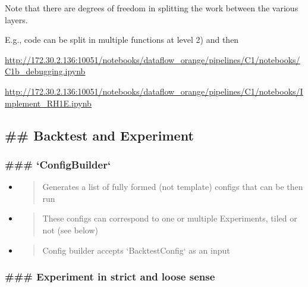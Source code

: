 \documentclass[11pt, reqno]{amsart}
\begin{document}
Note that there are degrees of freedom in splitting the work between the
various layers.

E.g., code can be split in multiple functions at level 2) and then

\href{http://172.30.2.136:10051/notebooks/dataflow_orange/pipelines/C1/notebooks/C1b_debugging.ipynb}{\ul{http://172.30.2.136:10051/notebooks/dataflow\_orange/pipelines/C1/notebooks/C1b\_debugging.ipynb}}

\href{http://172.30.2.136:10051/notebooks/dataflow_orange/pipelines/C1/notebooks/Implement_RH1E.ipynb}{\ul{http://172.30.2.136:10051/notebooks/dataflow\_orange/pipelines/C1/notebooks/Implement\_RH1E.ipynb}}

\hypertarget{backtest-and-experiment}{%
\subsection{\#\# Backtest and
Experiment}\label{backtest-and-experiment}}

\hypertarget{configbuilder}{%
\subsubsection{\texorpdfstring{\textbf{\#\#\#
`ConfigBuilder`}}{\#\#\# `ConfigBuilder`}}\label{configbuilder}}

\begin{itemize}
\item
  \begin{quote}
  Generates a list of fully formed (not template) configs that can be
  then run
  \end{quote}
\item
  \begin{quote}
  These configs can correspond to one or multiple Experiments, tiled or
  not (see below)
  \end{quote}
\item
  \begin{quote}
  Config builder accepts `BacktestConfig` as an input
  \end{quote}
\end{itemize}

\hypertarget{experiment-in-strict-and-loose-sense}{%
\subsubsection{\texorpdfstring{\textbf{\#\#\# Experiment in strict and
loose
sense}}{\#\#\# Experiment in strict and loose sense}}\label{experiment-in-strict-and-loose-sense}}
\end{document}

